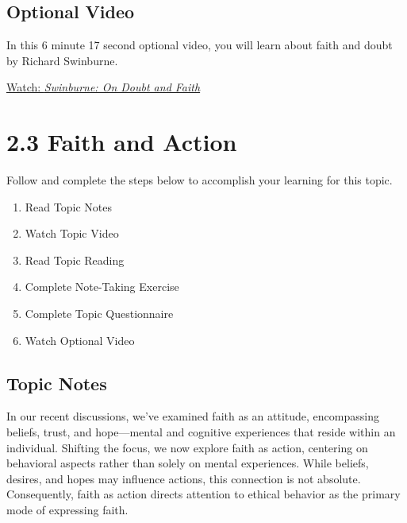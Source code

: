 \documentclass[
]{book}
\providecommand{\tightlist}{%
  \setlength{\itemsep}{0pt}\setlength{\parskip}{0pt}}
\begin{document}
\hypertarget{optional-video-5}{%
\subsection*{Optional Video}\label{optional-video-5}}

\begin{reflect}
In this 6 minute 17 second optional video, you will learn about faith and doubt by Richard Swinburne.

\href{https://www.youtube.com/watch?v=exsmSlxnbHQ}{Watch: \emph{Swinburne: On Doubt and Faith}}
\end{reflect}

\hypertarget{faith-and-action}{%
\section*{2.3 Faith and Action}\label{faith-and-action}}

Follow and complete the steps below to accomplish your learning for this topic.

\begin{enumerate}
\def\labelenumi{\arabic{enumi}.}
\tightlist
\item
  Read Topic Notes
\item
  Watch Topic Video
\item
  Read Topic Reading
\item
  Complete Note-Taking Exercise
\item
  Complete Topic Questionnaire
\item
  Watch Optional Video
\end{enumerate}

\hypertarget{topic-notes-6}{%
\subsection*{Topic Notes}\label{topic-notes-6}}

In our recent discussions, we've examined faith as an attitude, encompassing beliefs, trust, and hope---mental and cognitive experiences that reside within an individual. Shifting the focus, we now explore faith as action, centering on behavioral aspects rather than solely on mental experiences. While beliefs, desires, and hopes may influence actions, this connection is not absolute. Consequently, faith as action directs attention to ethical behavior as the primary mode of expressing faith.
\end{document}
